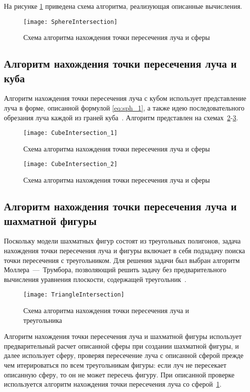 На рисунке \ref{fig:RaySphere} приведена схема алгоритма, реализующая описанные вычисления.

\begin{figure}[H]
	\centering
	\texttt{[image: SphereIntersection]}
	\caption{Схема алгоритма нахождения точки пересечения луча и сферы}
	\label{fig:RaySphere}
\end{figure}

\subsection{Алгоритм нахождения точки пересечения луча и куба}
Алгоритм нахождения точки пересечения луча с кубом использует представление луча в форме, описанной формулой \ref{eq:sph_1}, а также идею последовательного обрезания луча каждой из граней куба~\cite{lit7}.
Алгоритм представлен на схемах~\ref{fig:CubeIntersection_1}-\ref{fig:CubeIntersection_2}.
\begin{figure}[H]
	\centering
	\texttt{[image: CubeIntersection\_1]}
	\caption{Схема алгоритма нахождения точки пересечения луча и сферы}
	\label{fig:CubeIntersection_1}
\end{figure}

\begin{figure}[H]
	\centering
	\texttt{[image: CubeIntersection\_2]}
	\caption{Схема алгоритма нахождения точки пересечения луча и сферы}
	\label{fig:CubeIntersection_2}
\end{figure}

\subsection{Алгоритм нахождения точки пересечения луча и шахматной фигуры}
Поскольку модели шахматных фигур состоят из треугольных полигонов, задача нахождения точки пересечения луча и фигуры включает в себя подзадачу поиска точки пересечения с треугольником. Для решения задачи был выбран алгоритм Моллера~---~Трумбора, позволяющий решить задачу без предварительного вычисления уравнения плоскости, содержащей треугольник~\cite{lit8}.

\begin{figure}[H]
	\centering
	\texttt{[image: TriangleIntersection]}
	\caption{Схема алгоритма нахождения точки пересечения луча и треугольника}
	\label{fig:TriangleIntersection}
\end{figure}

Алгоритм нахождения точки пересечения луча и шахматной фигуры использует предварительный расчет описанной сферы при создании шахматной фигуры, и далее использует сферу, проверяя пересечение луча с описанной сферой прежде чем итерироваться по всем треугольникам фигуры: если луч не пересекает описанную сферу, то он не может пересечь фигуру. При описанной проверке используется алгоритм нахождения точки пересечения луча со сферой~\ref{fig:RaySphere}.

